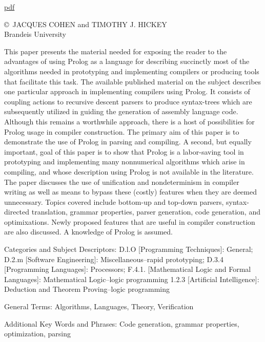 \label{cohen}\secdown
\href{https://drive.google.com/file/d/0B0u4WeMjO894eHpLcTE2bWU0SjQ/view?usp=sharing}{pdf}

\copyright\ JACQUES COHEN and TIMOTHY J. HICKEY\\
Brandeis University
\bigskip


This paper presents the material needed for exposing the reader to the
advantages of using Prolog as a language for describing succinctly most of the
algorithms needed in prototyping and implementing compilers or producing tools
that facilitate this task. The available published material on the subject
describes one particular approach in implementing compilers using Prolog. It
consists of coupling actions to recursive descent parsers to produce
syntax-trees which are subsequently utilized in guiding the generation of
assembly language code. Although this remains a worthwhile approach, there is a
host of possibilities for Prolog usage in compiler construction. The primary aim
of this paper is to demonstrate the use of Prolog in parsing and compiling. A
second, but equally important, goal of this paper is to show that Prolog is a
labor-saving tool in prototyping and implementing many nonnumerical algorithms
which arise in compiling, and whose description using Prolog is not available in
the literature. The paper discusses the use of unification and nondeterminism in
compiler writing as well as means to bypass these (costly) features when they
are deemed unnecessary. Topics covered include bottom-up and top-down parsers,
syntax-directed translation, grammar properties, parser generation, code
generation, and optimixations. Newly proposed features that are useful in
compiler construction are also discussed. A knowledge of Prolog is assumed.

Categories and Subject Descriptors: D.l.O [Programming Techniques]: General;
D.2.m [Software Engineering]: Miscellaneous--rapid prototyping; D.3.4
[Programming Languages]: Processors; F.4.1. [Mathematical Logic and Formal
Languages]: Mathematical Logic--logic programming 1.2.3 [Artificial
Intelligence]: Deduction and Theorem Proving--logic programming

General Terms: Algorithms, Languages, Theory, Verification

Additional Key Words and Phrases: Code generation, grammar properties,
optimization, parsing

